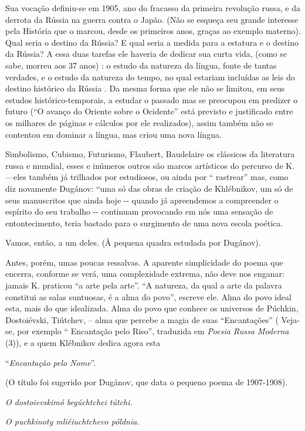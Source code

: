 Sua vocação definiu-se em 1905, ano do fracasso da primeira revolução
russa, e da derrota da Rússia na guerra contra o Japão. (Não se esqueça
seu grande interesse pela História que o marcou, desde os primeiros
anos, graças ao exemplo materno). Qual seria o destino da Rússia? E qual
seria a medida para a estatura e o destino da Rússia? A essa duas
tarefas ele haveria de dedicar sua curta vida, (como se sabe, morreu aos
37 anos) : o estudo da natureza da língua, fonte de tantas verdades, e o
estudo da natureza do tempo, no qual estariam incluídas as leis do
destino histórico da Rússia . Da mesma forma que ele não se limitou, em
seus estudos histórico-temporais, a estudar o passado mas se preocupou
em predizer o futuro (``O avanço do Oriente sobre o Ocidente'' está
previsto e justificado entre os milhares de páginas e cálculos por ele
realizados), assim também não se contentou em dominar a língua, mas
criou uma nova língua.

Simbolismo, Cubismo, Futurismo, Flaubert, Baudelaire os clássicos da
literatura russa e mundial, esses e inúmeros outros são marcos
artísticos do percurso de K.---eles também já trilhados por estudiosos,
ou ainda por `` rastrear'' mas, como diz novamente Dugánov: ``uma só das
obras de criação de Khlébnikov, um só de seus manuscritos que ainda hoje
-\/- quando já apreendemos a compreender o espírito do seu trabalho -\/-
continuam provocando em nós uma sensação de entontecimento, teria
bastado para o surgimento de uma nova escola poética.

Vamos, então, a um deles. (À pequena quadra estudada por Dugánov).

Antes, porém, umas poucas ressalvas. A aparente simplicidade do poema
que encerra, conforme se verá, uma complexidade extrema, não deve nos
enganar: jamais K. praticou ``a arte pela arte''. ``A natureza, da qual
a arte da palavra constitui as salas suntuosas, é a alma do povo'',
escreve ele. Alma do povo ideal esta, mais do que idealizada. Alma do
povo que conhece os universos de Púchkin, Dostoiévski, Tiútchev, -- alma
que percebe a magia de suas ``Encantações'' ( Veja-se, por exemplo ``
Encantação pelo Riso'', traduzida em \emph{Poesia Russa Moderna} (3)), e
a quem Klébnikov dedica agora esta

``\emph{Encantação pelo Nome}''.

(O título foi sugerido por Dugánov, que data o pequeno poema de
1907-1908).

\emph{O dostoievskimó begúchtchei tútchi.}

\emph{O puchkinoty mliéiuchtchevo póldnia.}

